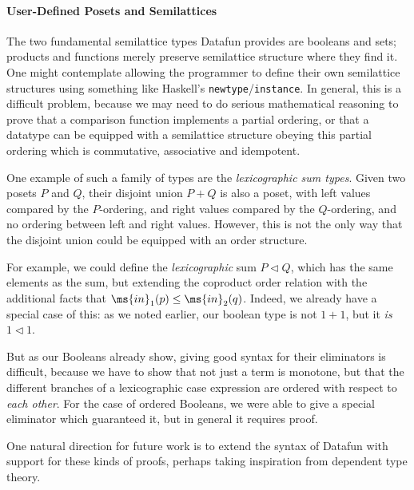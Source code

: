 \paragraph{User-Defined Posets and Semilattices}
The two fundamental semilattice types Datafun provides are booleans and sets;
products and functions merely preserve semilattice structure where they find it.
One might contemplate allowing the programmer to define their own semilattice
structures using something like Haskell's \texttt{newtype}/\texttt{instance}. In
general, this is a difficult problem, because we may need to do serious
mathematical reasoning to prove that a comparison function implements a partial
ordering, or that a datatype can be equipped with a semilattice structure
obeying this partial ordering which is commutative, associative and idempotent.

One example of such a family of types are the \emph{lexicographic sum
  types}. Given two posets $P$ and $Q$, their disjoint union $P + Q$
is also a poset, with left values compared by the $P$-ordering, and
right values compared by the $Q$-ordering, and no ordering between
left and right values. However, this is not the only way that the
disjoint union could be equipped with an order structure.

For example, we could define the \emph{lexicographic} sum $P \lhd Q$,
which has the same elements as the sum, but extending the coproduct order
relation with the additional
facts that $\ms{in}_1(p) \leq \ms{in}_2(q)$. Indeed, we already have a
special case of this: as we noted earlier, our boolean type is not $1
+ 1$, but it \emph{is} $1 \lhd 1$.

But as our Booleans already show, giving good syntax for their
eliminators is difficult, because we have to show that not just a term
is monotone, but that the different branches of a lexicographic case
expression are ordered with respect to \emph{each other}. For the case
of ordered Booleans, we were able to give a special eliminator which
guaranteed it, but in general it requires proof.

One natural direction for future work is to extend the syntax of
Datafun with support for these kinds of proofs, perhaps taking
inspiration from dependent type theory.
